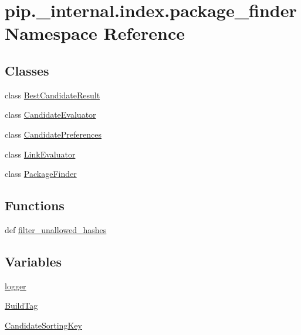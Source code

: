 \hypertarget{namespacepip_1_1__internal_1_1index_1_1package__finder}{}\section{pip.\+\_\+internal.\+index.\+package\+\_\+finder Namespace Reference}
\label{namespacepip_1_1__internal_1_1index_1_1package__finder}
\subsection*{Classes}
\begin{DoxyCompactItemize}
\item 
class \hyperlink{classpip_1_1__internal_1_1index_1_1package__finder_1_1BestCandidateResult}{Best\+Candidate\+Result}
\item 
class \hyperlink{classpip_1_1__internal_1_1index_1_1package__finder_1_1CandidateEvaluator}{Candidate\+Evaluator}
\item 
class \hyperlink{classpip_1_1__internal_1_1index_1_1package__finder_1_1CandidatePreferences}{Candidate\+Preferences}
\item 
class \hyperlink{classpip_1_1__internal_1_1index_1_1package__finder_1_1LinkEvaluator}{Link\+Evaluator}
\item 
class \hyperlink{classpip_1_1__internal_1_1index_1_1package__finder_1_1PackageFinder}{Package\+Finder}
\end{DoxyCompactItemize}
\subsection*{Functions}
\begin{DoxyCompactItemize}
\item 
def \hyperlink{namespacepip_1_1__internal_1_1index_1_1package__finder_a99ee23602b1827db46e930852443e6e1}{filter\+\_\+unallowed\+\_\+hashes}
\end{DoxyCompactItemize}
\subsection*{Variables}
\begin{DoxyCompactItemize}
\item 
\hyperlink{namespacepip_1_1__internal_1_1index_1_1package__finder_a230f7eba264091230ab47832046fc2f5}{logger}
\item 
\hyperlink{namespacepip_1_1__internal_1_1index_1_1package__finder_a6e43cd6584e1508c9578cad30e0fdc2a}{Build\+Tag}
\item 
\hyperlink{namespacepip_1_1__internal_1_1index_1_1package__finder_a8c4b6db75eb88d67a055ab321dd6ec30}{Candidate\+Sorting\+Key}
\end{DoxyCompactItemize}


